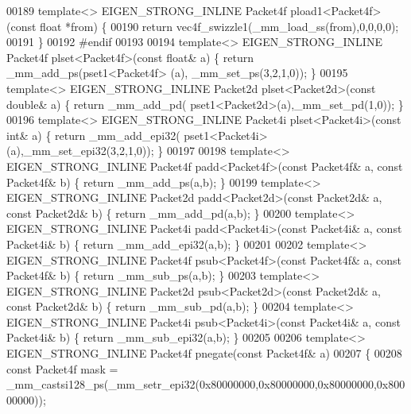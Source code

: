 \begin{DoxyCode}
00189 \textcolor{keyword}{template}<> EIGEN\_STRONG\_INLINE Packet4f pload1<Packet4f>(\textcolor{keyword}{const} \textcolor{keywordtype}{float} *from) \{
00190   \textcolor{keywordflow}{return} vec4f\_swizzle1(\_mm\_load\_ss(from),0,0,0,0);
00191 \}
00192 \textcolor{preprocessor}{#endif}
00193   
00194 \textcolor{keyword}{template}<> EIGEN\_STRONG\_INLINE Packet4f plset<Packet4f>(\textcolor{keyword}{const} \textcolor{keywordtype}{float}& a) \{ \textcolor{keywordflow}{return} \_mm\_add\_ps(pset1<Packet4f>
      (a), \_mm\_set\_ps(3,2,1,0)); \}
00195 \textcolor{keyword}{template}<> EIGEN\_STRONG\_INLINE Packet2d plset<Packet2d>(\textcolor{keyword}{const} \textcolor{keywordtype}{double}& a) \{ \textcolor{keywordflow}{return} \_mm\_add\_pd(
      pset1<Packet2d>(a),\_mm\_set\_pd(1,0)); \}
00196 \textcolor{keyword}{template}<> EIGEN\_STRONG\_INLINE Packet4i plset<Packet4i>(\textcolor{keyword}{const} \textcolor{keywordtype}{int}& a) \{ \textcolor{keywordflow}{return} \_mm\_add\_epi32(
      pset1<Packet4i>(a),\_mm\_set\_epi32(3,2,1,0)); \}
00197 
00198 \textcolor{keyword}{template}<> EIGEN\_STRONG\_INLINE Packet4f padd<Packet4f>(\textcolor{keyword}{const} Packet4f& a, \textcolor{keyword}{const} Packet4f& b) \{ \textcolor{keywordflow}{return} 
      \_mm\_add\_ps(a,b); \}
00199 \textcolor{keyword}{template}<> EIGEN\_STRONG\_INLINE Packet2d padd<Packet2d>(\textcolor{keyword}{const} Packet2d& a, \textcolor{keyword}{const} Packet2d& b) \{ \textcolor{keywordflow}{return} 
      \_mm\_add\_pd(a,b); \}
00200 \textcolor{keyword}{template}<> EIGEN\_STRONG\_INLINE Packet4i padd<Packet4i>(\textcolor{keyword}{const} Packet4i& a, \textcolor{keyword}{const} Packet4i& b) \{ \textcolor{keywordflow}{return} 
      \_mm\_add\_epi32(a,b); \}
00201 
00202 \textcolor{keyword}{template}<> EIGEN\_STRONG\_INLINE Packet4f psub<Packet4f>(\textcolor{keyword}{const} Packet4f& a, \textcolor{keyword}{const} Packet4f& b) \{ \textcolor{keywordflow}{return} 
      \_mm\_sub\_ps(a,b); \}
00203 \textcolor{keyword}{template}<> EIGEN\_STRONG\_INLINE Packet2d psub<Packet2d>(\textcolor{keyword}{const} Packet2d& a, \textcolor{keyword}{const} Packet2d& b) \{ \textcolor{keywordflow}{return} 
      \_mm\_sub\_pd(a,b); \}
00204 \textcolor{keyword}{template}<> EIGEN\_STRONG\_INLINE Packet4i psub<Packet4i>(\textcolor{keyword}{const} Packet4i& a, \textcolor{keyword}{const} Packet4i& b) \{ \textcolor{keywordflow}{return} 
      \_mm\_sub\_epi32(a,b); \}
00205 
00206 \textcolor{keyword}{template}<> EIGEN\_STRONG\_INLINE Packet4f pnegate(\textcolor{keyword}{const} Packet4f& a)
00207 \{
00208   \textcolor{keyword}{const} Packet4f mask = \_mm\_castsi128\_ps(\_mm\_setr\_epi32(0x80000000,0x80000000,0x80000000,0x80000000));

\end{DoxyCode}

